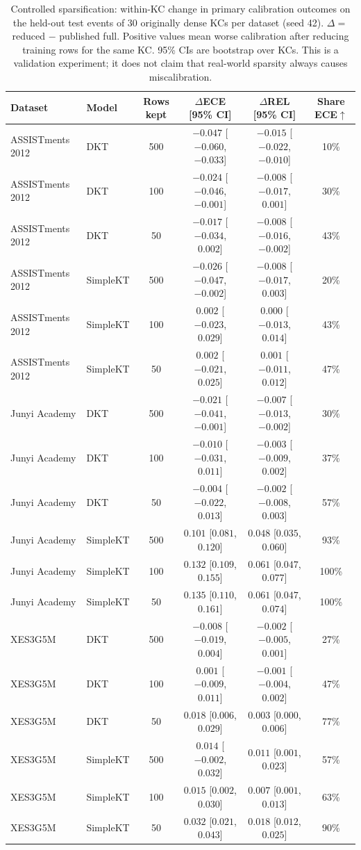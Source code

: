 \begin{table}[htbp]
\caption{Controlled sparsification: within-KC change in primary calibration outcomes on the held-out test events of 30 originally dense KCs per dataset (seed 42). $\Delta = $ reduced $-$ published full. Positive values mean worse calibration after reducing training rows for the same KC. 95\% CIs are bootstrap over KCs. This is a validation experiment; it does not claim that real-world sparsity always causes miscalibration.}
\label{tab:a9_sparsification}
\centering
\scriptsize
\begin{tabular}{llcccc}
\toprule
Dataset & Model & Rows kept & $\Delta$ECE [95\% CI] & $\Delta$REL [95\% CI] & Share ECE$\uparrow$ \\
\midrule
ASSISTments 2012 & DKT & 500 & $-0.047$ [$-0.060$, $-0.033$] & $-0.015$ [$-0.022$, $-0.010$] & 10\% \\
ASSISTments 2012 & DKT & 100 & $-0.024$ [$-0.046$, $-0.001$] & $-0.008$ [$-0.017$, $0.001$] & 30\% \\
ASSISTments 2012 & DKT & 50 & $-0.017$ [$-0.034$, $0.002$] & $-0.008$ [$-0.016$, $-0.002$] & 43\% \\
ASSISTments 2012 & SimpleKT & 500 & $-0.026$ [$-0.047$, $-0.002$] & $-0.008$ [$-0.017$, $0.003$] & 20\% \\
ASSISTments 2012 & SimpleKT & 100 & $0.002$ [$-0.023$, $0.029$] & $0.000$ [$-0.013$, $0.014$] & 43\% \\
ASSISTments 2012 & SimpleKT & 50 & $0.002$ [$-0.021$, $0.025$] & $0.001$ [$-0.011$, $0.012$] & 47\% \\
\midrule
Junyi Academy & DKT & 500 & $-0.021$ [$-0.041$, $-0.001$] & $-0.007$ [$-0.013$, $-0.002$] & 30\% \\
Junyi Academy & DKT & 100 & $-0.010$ [$-0.031$, $0.011$] & $-0.003$ [$-0.009$, $0.002$] & 37\% \\
Junyi Academy & DKT & 50 & $-0.004$ [$-0.022$, $0.013$] & $-0.002$ [$-0.008$, $0.003$] & 57\% \\
Junyi Academy & SimpleKT & 500 & $0.101$ [$0.081$, $0.120$] & $0.048$ [$0.035$, $0.060$] & 93\% \\
Junyi Academy & SimpleKT & 100 & $0.132$ [$0.109$, $0.155$] & $0.061$ [$0.047$, $0.077$] & 100\% \\
Junyi Academy & SimpleKT & 50 & $0.135$ [$0.110$, $0.161$] & $0.061$ [$0.047$, $0.074$] & 100\% \\
\midrule
XES3G5M & DKT & 500 & $-0.008$ [$-0.019$, $0.004$] & $-0.002$ [$-0.005$, $0.001$] & 27\% \\
XES3G5M & DKT & 100 & $0.001$ [$-0.009$, $0.011$] & $-0.001$ [$-0.004$, $0.002$] & 47\% \\
XES3G5M & DKT & 50 & $0.018$ [$0.006$, $0.029$] & $0.003$ [$0.000$, $0.006$] & 77\% \\
XES3G5M & SimpleKT & 500 & $0.014$ [$-0.002$, $0.032$] & $0.011$ [$0.001$, $0.023$] & 57\% \\
XES3G5M & SimpleKT & 100 & $0.015$ [$0.002$, $0.030$] & $0.007$ [$0.001$, $0.013$] & 63\% \\
XES3G5M & SimpleKT & 50 & $0.032$ [$0.021$, $0.043$] & $0.018$ [$0.012$, $0.025$] & 90\% \\
\bottomrule
\end{tabular}
\end{table}
